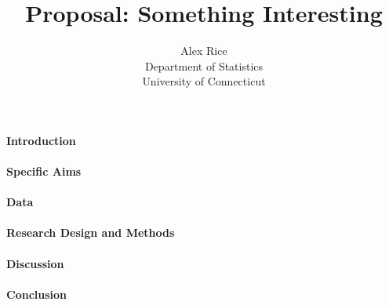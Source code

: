 \documentclass[12pt]{article}
\title{Proposal: Something Interesting}
\author{Alex Rice\\
  Department of Statistics\\
  University of Connecticut
}
\begin{document}
\maketitle


\paragraph{Introduction}
\lipsum[1] \citep{Villela2019analysis}

\paragraph{Specific Aims}
\lipsum[2]

\paragraph{Data}
\lipsum[3]

\paragraph{Research Design and Methods}
\lipsum[4]

\paragraph{Discussion}
\lipsum[5] \citep{Tiancai2019analysis}

\paragraph{Conclusion}
\lipsum[1]




\end{document}
